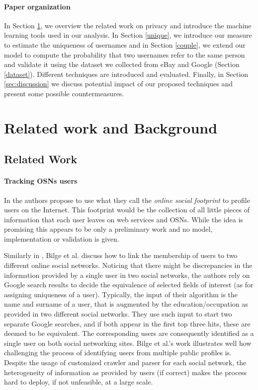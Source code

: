 \documentclass[letterpaper]{sig-alternate}
\begin{document}
\paragraph{Paper organization}

In Section \ref{overview}, we overview the related work on privacy and
introduce the machine learning tools used in our analysis.  In Section
\ref{unique}, we introduce our measure to estimate the uniqueness of usernames
and in Section \ref{couple}, we extend our model to compute the probability
that two usernames refer to the same person and validate it using the dataset
we collected from eBay and Google (Section \ref{dataset}).  Different
techniques are introduced and evaluated. Finally, in Section
\ref{sec:discussion} we discuss potential impact of our proposed techniques and
present some possible countermeasures. 







\section{Related work and Background}
\label{overview}

\subsection{Related Work}

\paragraph{Tracking OSNs users}

In \cite{footprint} the authors propose to use what they call the {\em online
social footprint} to profile users on the Internet. This footprint would be the
collection of all little pieces of information that each user leaves on
web services and OSNs. While the idea is promising this appears to be only a preliminary work and
no model, implementation or validation is given.

Similarly in \cite{www2009}, Bilge et al. discuss how to link the
membership of users to two different online social networks. Noticing that
there might be discrepancies in the information provided by a single user in
two social networks, the authors rely on Google search results to decide the
equivalence of selected fields of interest (as for assigning uniqueness of a
user). Typically, the input of their algorithm is the name and surname of a
user, that is augmented by the education/occupation as provided in two
different social networks. They use such input to start two separate Google
searches, and if both appear in the first top three hits, these are deemed to
be equivalent. The corresponding users are consequently identified as a single
user on both social networking sites.  Bilge et al.'s work illustrates well how
challenging the process of identifying users from multiple public profiles is.
Despite the usage of customized crawler and parser for each social network, the
heterogeneity of information as provided by users (if correct) makes the
process hard to deploy, if not unfeasible, at a large scale.  
 
\end{document}
